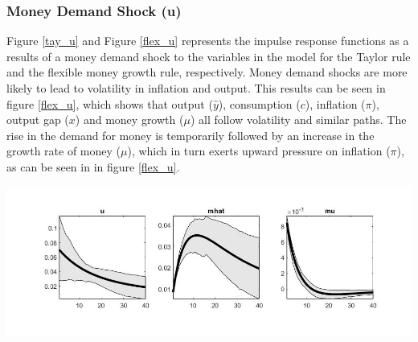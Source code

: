 \documentclass[11pt,preprint, authoryear]{elsarticle}
\let\origfigure\figure
\let\endorigfigure\endfigure
\renewenvironment{figure}[1][2] {
    \expandafter\origfigure\expandafter[H]
} {
    \endorigfigure
}
\numberwithin{equation}{section}
\numberwithin{figure}{section}
\numberwithin{table}{section}
\begin{document}
\hypertarget{money-demand-shock-u}{%
\subsubsection{Money Demand Shock (u)}\label{money-demand-shock-u}}

Figure \ref{tay_u} and Figure \ref{flex_u} represents the impulse
response functions as a results of a money demand shock to the variables
in the model for the Taylor rule and the flexible money growth rule,
respectively. Money demand shocks are more likely to lead to volatility
in inflation and output. This results can be seen in figure
\ref{flex_u}, which shows that output (\(\hat{y}\)), consumption
(\(c\)), inflation (\(\pi\)), output gap (\(x\)) and money growth
(\(\mu\)) all follow volatility and similar paths. The rise in the
demand for money is temporarily followed by an increase in the growth
rate of money (\(\mu\)), which in turn exerts upward pressure on
inflation (\(\pi\)), as can be seen in in figure \ref{flex_u}.

\begin{figure}
\centering
\includegraphics[scale=0.5]{tay_u.jpg}
\caption{Orthogonalized Shock to Money Demand Shock - Taylor Rule}
\label{tay_u}
\end{figure}
\end{document}
